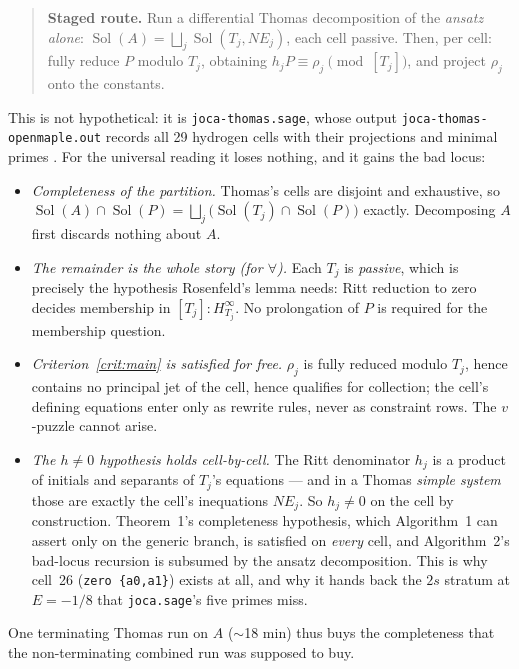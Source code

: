 \documentclass[11pt]{article}
\newcommand{\code}[1]{\texttt{#1}}
\DeclareMathOperator{\Sol}{Sol}
\begin{document}
\begin{quote}
\textbf{Staged route.} Run a differential Thomas decomposition of the
\emph{ansatz alone}: $\Sol(A) = \bigsqcup_j \Sol(T_j,NE_j)$, each cell
passive. Then, per cell: fully reduce $P$ modulo $T_j$, obtaining
$h_j P \equiv \rho_j \pmod{[T_j]}$, and project $\rho_j$ onto the constants.
\end{quote}

This is not hypothetical: it is \code{joca-thomas.sage}, whose output
\code{joca-thomas-openmaple.out} records all 29 hydrogen cells with their
projections and minimal primes \cite{joca-thomas-report}. For the universal
reading it loses nothing, and it gains the bad locus:

\begin{itemize}
\item \emph{Completeness of the partition.} Thomas's cells are disjoint and
  exhaustive, so $\Sol(A)\cap\Sol(P) = \bigsqcup_j
  \bigl(\Sol(T_j)\cap\Sol(P)\bigr)$ exactly. Decomposing $A$ first discards
  nothing about $A$.
\item \emph{The remainder is the whole story (for $\forall$).} Each $T_j$ is
  \emph{passive}, which is precisely the hypothesis Rosenfeld's lemma needs:
  Ritt reduction to zero decides membership in $[T_j]:H_{T_j}^\infty$. No
  prolongation of $P$ is required for the membership question.
\item \emph{Criterion~\ref{crit:main} is satisfied for free.} $\rho_j$ is
  fully reduced modulo $T_j$, hence contains no principal jet of the cell,
  hence qualifies for collection; the cell's defining equations enter only as
  rewrite rules, never as constraint rows. The $v$-puzzle cannot arise.
\item \emph{The $h\ne 0$ hypothesis holds cell-by-cell.} The Ritt denominator
  $h_j$ is a product of initials and separants of $T_j$'s equations --- and in
  a Thomas \emph{simple system} those are exactly the cell's inequations
  $NE_j$. So $h_j \ne 0$ on the cell by construction. Theorem~1's completeness
  hypothesis, which Algorithm~1 can assert only on the generic branch, is
  satisfied on \emph{every} cell, and Algorithm~2's bad-locus recursion is
  subsumed by the ansatz decomposition. This is why cell~26
  (\code{zero \{a0,a1\}}) exists at all, and why it hands back the $2s$
  stratum at $E=-1/8$ that \code{joca.sage}'s five primes miss.
\end{itemize}

One terminating Thomas run on $A$ ($\sim$18 min) thus buys the completeness
that the non-terminating combined run was supposed to buy.
\end{document}
